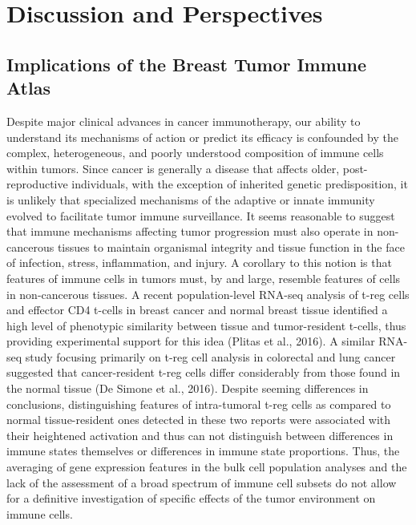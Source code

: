 
\chapter*{Discussion and Perspectives} 

\section{Implications of the Breast Tumor Immune Atlas}

Despite major clinical advances in cancer immunotherapy, our ability to understand its mechanisms of action or predict its efficacy is confounded by the complex, heterogeneous, and poorly understood composition of immune cells within tumors. 
Since cancer is generally a disease that affects older, post-reproductive individuals, with the exception of inherited genetic predisposition, it is unlikely that specialized mechanisms of the adaptive or innate immunity evolved to facilitate tumor immune surveillance. 
It seems reasonable to suggest that immune mechanisms affecting tumor progression must also operate in non-cancerous tissues to maintain organismal integrity and tissue function in the face of infection, stress, inflammation, and injury. 
A corollary to this notion is that features of immune cells in tumors must, by and large, resemble features of cells in non-cancerous tissues. 
A recent population-level RNA-seq analysis of t-reg cells and effector CD4 t-cells in breast cancer and normal breast tissue identified a high level of phenotypic similarity between tissue and tumor-resident t-cells, thus providing experimental support for this idea (Plitas et al., 2016). A similar RNA-seq study focusing primarily on t-reg cell analysis in colorectal and lung cancer suggested that cancer-resident t-reg cells differ considerably from those found in the normal tissue (De Simone et al., 2016).  %
Despite seeming differences in conclusions, distinguishing features of intra-tumoral t-reg cells as compared to normal tissue-resident ones detected in these two reports were associated with their heightened activation and thus can not distinguish between differences in immune states themselves or differences in immune state proportions. 
Thus, the averaging of gene expression features in the bulk cell population analyses and the lack of the assessment of a broad spectrum of immune cell subsets do not allow for a definitive investigation of specific effects of the tumor environment on immune cells. 


